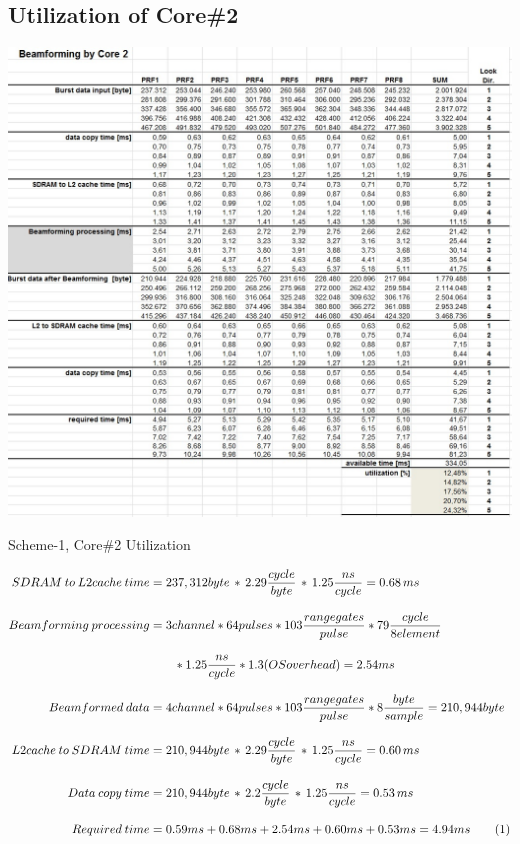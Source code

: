 \subsection{Utilization of Core\#2}
\begin{table}[h!]
	\centering
	\includegraphics[width=150mm]{figures/aa_scheme1_cpu_util_2}
	\caption{Scheme-1, Core\#2 Utilization}
	\label{fig:existing_analysis:aa_scheme1_cpu_util2}
\end{table}
\begin{align*}
\label{aa:scheme1:core2:equ1}
	SDRAM \: to \: L2cache \: time &= 237,312 byte \, * \, 2.29\frac{cycle}{byte} \, * \, 1.25\frac{ns}{cycle} = 0.68 \, ms \\[0.3cm]
	Beamforming \: processing &= 3channel * 64pulses * 103 \frac{range gates}{pulse} * 79\frac{cycle}{8 element} \\[0.3cm] 
	&\qquad * 1.25\frac{ns}{cycle} * 1.3(OSoverhead) = 2.54ms\\[0.3cm]
	Beamformed \: data &= 4channel * 64pulses * 103 \frac{range gates}{pulse} *8\frac{byte}{sample} = 210,944byte \\[0.3cm]
	L2cache \: to \: SDRAM \: time &= 210,944 byte \, * \, 2.29\frac{cycle}{byte} \, * \, 1.25\frac{ns}{cycle} = 0.60 \, ms \\[0.3cm]
	Data \: copy \: time &= 210,944 byte \, * \, 2.2\frac{cycle}{byte} \, * \, 1.25\frac{ns}{cycle} = 0.53 \, ms \\[0.3cm]
	Required \: time &= 0.59ms + 0.68ms + 2.54ms + 0.60ms + 0.53ms = 4.94ms \stepcounter{equation}\tag{\theequation} 
\end{align*}


